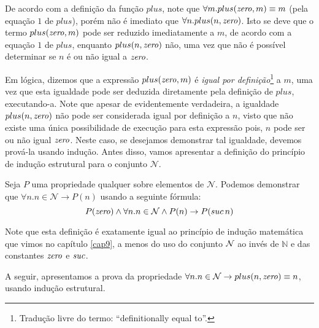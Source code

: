 De acordo com a definição da função $plus$, note que $\forall m. plus(\textit{zero\/},m)
\equiv m$ (pela equação $1$ de $plus$), porém não é imediato que
$\forall n. plus(n,\textit{zero\/})$. Isto se deve que o termo $plus(\textit{zero\/},m)$ pode ser
reduzido imediatamente a $m$, de acordo com a equação $1$ de $plus$,
enquanto $plus(n,\textit{zero\/})$ não, uma vez que não é possível determinar se $n$
é ou não igual a $\textit{zero\/}$.

Em lógica, dizemos que a expressão $plus(\textit{zero\/},m)$ é \textit{igual por
  definição}\footnote{Tradução livre do termo: ``definitionally equal
  to''.} a $m$, uma vez que esta igualdade pode ser deduzida
diretamente pela definição de $plus$, executando-a. Note que apesar de
evidentemente verdadeira, a igualdade $plus(n,\textit{zero\/})$ não pode ser
considerada igual por definição a $n$, visto que não existe uma única
possibilidade de execução para esta expressão pois, $n$ pode ser ou
não igual $\textit{zero\/}$. Neste caso, se desejamos demonstrar tal igualdade,
devemos prová-la usando indução. Antes disso, vamos apresentar a
definição do princípio de indução estrutural para o conjunto
$\mathcal{N}$.

\begin{Definition}
Seja $P$ uma propriedade qualquer sobre elementos de
$\mathcal{N}$. Podemos demonstrar que $\forall n. n\in\mathcal{N}\to
P(n)$ usando a seguinte fórmula:
\[
P(\textit{zero\/})\land\forall n.n\in\mathcal{N}\land P(n) \to P(suc\,n)
\]
\end{Definition}
Note que esta definição é exatamente igual ao princípio de indução
matemática que vimos no capítulo \ref{cap9}, a menos do uso do
conjunto  $\mathcal{N}$ ao invés de $\mathbb{N}$ e das constantes $\textit{zero\/}$ e
$\textit{suc\/}$.

A seguir, apresentamos a prova da propriedade $\forall n. n\in\mathcal{N}\to
plus(n,\textit{zero\/}) \equiv n$, usando indução estrutural.

